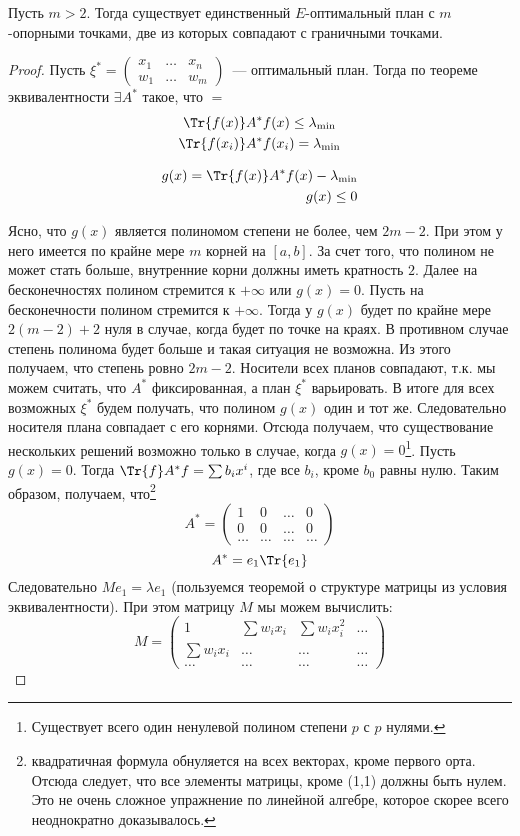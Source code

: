 \begin{thm}
Пусть $m > 2$. Тогда существует единственный $E$-оптимальный план с $m$-опорными точками, две из которых совпадают с граничными точками.
\end{thm}
\begin{proof}
Пусть $\xi^* = \begin{pmatrix} x_1 & … & x_n \\ w_1 & … & w_m \end{pmatrix}$ — оптимальный план. Тогда по теореме эквивалентности $\exists A^{*}$ такое, что $=$
\begin{gather*}
\Tr{f(x)}A^{*}f(x) \leq \lambda_{\min} \\
\Tr{f(x_i)}A^{*}f(x_i) = \lambda_{\min}
\end{gather*}

\begin{equation}
\begin{split}
g(x) = \Tr{f(x)}A^{*} f(x) - \lambda_{\min} \\
g(x) \leq 0
\end{split}
\end{equation}

Ясно, что $g(x)$ является полиномом степени не более, чем $2m-2$. При этом у него имеется по крайне мере $m$ корней на $[a,b]$. За счет того, что полином не может стать больше, внутренние корни должны иметь кратность $2$. Далее на бесконечностях полином стремится к $+\infty$ или $g(x) =0$. Пусть на бесконечности полином стремится к $+\infty$. Тогда у $g(x)$
будет по крайне мере  $2(m-2)+2$ нуля в случае, когда будет по точке на краях.
В противном случае степень полинома будет больше и такая ситуация не возможна. Из этого получаем, что степень ровно $2m-2$. 
Носители всех планов совпадают, т.к. мы можем считать, что $A^{*}$ фиксированная,  а план $\xi^{*}$ варьировать.  В итоге для всех возможных $\xi^{*}$ будем получать, что полином $g(x)$ один и тот же. Следовательно носителя плана совпадает с его корнями. Отсюда получаем, что существование нескольких решений возможно только в случае, когда $g(x) = 0$\footnote{Существует всего один ненулевой полином степени $p$ с $p$ нулями.}.
Пусть $g(x) = 0$. Тогда $\Tr{f}A^{*}f = \sum b_i x^i$,  где все $b_i$, кроме $b_0$ равны нулю. Таким образом, получаем, что\footnote{квадратичная формула обнуляется на всех векторах, кроме первого орта. Отсюда следует, что все элементы матрицы, кроме (1,1) должны быть нулем. Это не очень сложное упражнение по линейной алгебре, которое скорее всего неоднократно доказывалось.} 
$$ A^{*} = \begin{pmatrix} 1 & 0 & … & 0 \\ 0 & 0 & … & 0 \\ … & … & … & … \end{pmatrix}$$
$$A^{*} = e_1 \Tr{e_1}$$
Следовательно $Me_1 = \lambda e_1$ (пользуемся теоремой о структуре матрицы из условия эквивалентности). При этом матрицу $M$ мы можем вычислить:
$$ M = \begin{pmatrix} 1 & \sum w_ix_i & \sum w_ix_i^2 & … \\ \sum w_i x_i & … & … & …\\  … & … & … & … \end{pmatrix} $$


\end{proof}
